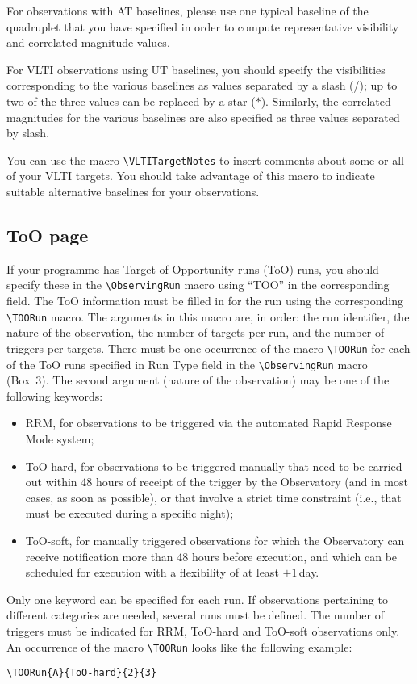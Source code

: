 \documentclass{article}
\begin{document}
For observations with AT baselines, please use one typical baseline of the
quadruplet that you have specified in order to compute
representative visibility and correlated magnitude values.

For VLTI observations using UT baselines, you should specify the visibilities
corresponding to the various baselines as values separated by a
slash (/); up to two of the three values can be replaced by a star
($*$).  Similarly, the correlated magnitudes for the various baselines are also
specified as three values separated by slash.

You can use the macro \verb|\VLTITargetNotes| to insert comments about
some or all of your VLTI targets. You should take advantage of this
macro to indicate suitable alternative baselines for your
observations.

\subsection{ToO page}
\label{sec:toopage}


If your programme has Target of Opportunity runs (ToO) runs, 
you should specify these in the  \verb|\ObservingRun| macro 
using ``TOO'' in the corresponding field. 
The ToO information must be filled in for the run
using the corresponding  
\verb|\TOORun| macro.  The arguments in this macro 
are, in order: the run identifier,
the nature of the observation, the number of 
targets per run, and the number of triggers per targets. There must be
one occurrence of the macro \verb|\TOORun| for each of the ToO runs specified
in Run Type field in  the \verb|\ObservingRun| macro (Box~3).
 The second argument (nature of the observation) may be one
of the following keywords:
\begin{itemize}
\item RRM, for observations to be triggered via the automated Rapid
  Response Mode system;
\item ToO-hard, for observations to be triggered manually that need to
  be carried out within 48 hours of receipt of the trigger by the
  Observatory (and in most cases, as soon as possible), or that
  involve a strict time constraint (i.e., that must be executed during
  a specific night);
\item ToO-soft, for manually triggered observations for which the
  Observatory can receive notification more than 48 hours before
  execution, and which can be scheduled for execution with a
  flexibility of at least $\pm1$\,day.
\end{itemize}
Only one keyword can be specified for each run. If observations
pertaining to different categories are needed,
several runs must be defined. The number of triggers must be indicated
for RRM, ToO-hard and ToO-soft observations only.
An occurrence of the macro \verb|\TOORun|
looks like the following example:
\begin{verbatim}
\TOORun{A}{ToO-hard}{2}{3}
\end{verbatim}
\end{document}
